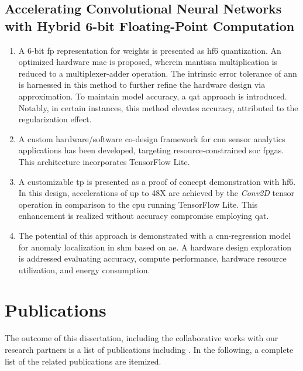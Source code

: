 \subsection{Accelerating Convolutional Neural Networks with Hybrid 6-bit Floating-Point Computation}
\begin{enumerate}
	\item A 6-bit \gls{fp} representation for weights is presented as \gls{hf6} quantization. An optimized hardware \gls{mac} is proposed, wherein mantissa multiplication is reduced to a multiplexer-adder operation. The intrinsic error tolerance of \gls{ann} is harnessed in this method to further refine the hardware design via approximation. To maintain model accuracy, a \gls{qat} approach is introduced. Notably, in certain instances, this method elevates accuracy, attributed to the regularization effect.
	
	\item A custom hardware/software co-design framework for \gls{cnn} sensor analytics applications has been developed, targeting resource-constrained \gls{soc} \glspl{fpga}. This architecture incorporates TensorFlow Lite.
	
	\item A customizable \gls{tp} is presented as a proof of concept demonstration with \gls{hf6}. In this design, accelerations of up to 48X are achieved by the \emph{Conv2D} tensor operation in comparison to the \gls{cpu} running TensorFlow Lite. This enhancement is realized without accuracy compromise employing \gls{qat}.
	
	\item The potential of this approach is demonstrated with a \gls{cnn}-regression model for anomaly localization in \gls{shm} based on \gls{ae}. A hardware design exploration is addressed evaluating accuracy, compute performance, hardware resource utilization, and energy consumption.
\end{enumerate}

\section{Publications}
The outcome of this dissertation, including the collaborative works with our research partners is a list of publications including \cite{nevarez2020accelerator, nevarez2021accelerating, yn2022cnnsensor}. In the following, a complete list of the related publications are itemized.

